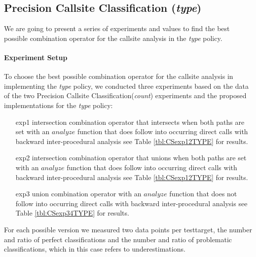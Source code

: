 %	
%
%
%
\newpage
\subsection{Precision Callsite Classification (\textit{type})}
\label{subsection:typeshieldprecision}
We are going to present a series of experiments and values to find the best possible combination operator for the callsite analysis in the \textit{type} policy.

\paragraph{Experiment Setup}
To choose the best possible combination operator for the callsite analysis in implementing the \textit{type} policy, we conducted three  experiments based on the data of the two Precision Callsite Classification(\textit{count}) experiments and the proposed implementations for the \textit{type} policy:
\begin{enumerate}
\item[exp1] intersection combination operator that intersects when both paths are set with an $analyze$ function that does follow into occurring direct calls with backward inter-procedural analysis see Table \ref{tbl:CSexp12TYPE} for results.

\item[exp2] intersection combination operator that unions when both paths are set with an $analyze$ function that does follow into occurring direct calls  with backward inter-procedural analysis  see Table \ref{tbl:CSexp12TYPE} for results.

\item[exp3] union combination operator with an $analyze$ function that does not follow into occurring direct calls  with backward inter-procedural analysis  see Table \ref{tbl:CSexp34TYPE} for results.

\end{enumerate}
For each possible version we measured two data points per testtarget, the number and ratio of perfect classifications and the number and ratio of problematic classifications, which in this case refers to underestimations.

